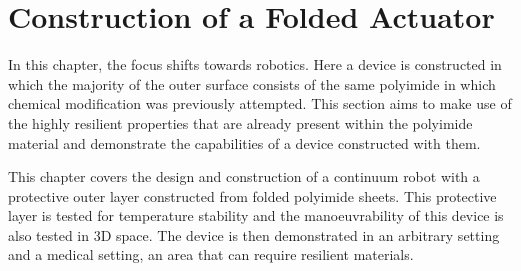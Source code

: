 \chapter{Construction of a Folded Actuator} %
\label{cha:storm} %

In this chapter, the focus shifts towards robotics. Here a device is constructed in which the majority of the outer surface consists of the same polyimide in which chemical modification was previously attempted. This section aims to make use of the highly resilient properties that are already present within the polyimide material and demonstrate the capabilities of a device constructed with them. 

This chapter covers the design and construction of a continuum robot with a protective outer layer constructed from folded polyimide sheets. This protective layer is tested for temperature stability and the manoeuvrability of this device is also tested in 3D space. The device is then demonstrated in an arbitrary setting and a medical setting, an area that can require resilient materials. 



 
 
 

 
